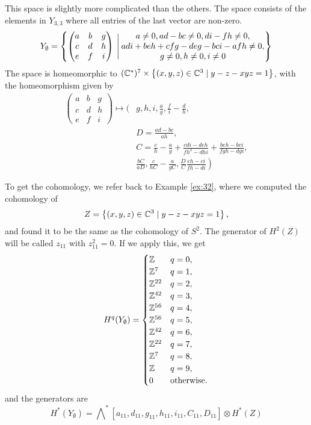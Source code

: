 This space is slightly more complicated than the others. The space
consists of the elements in $Y_{3,3}$ where all entries of the last
vector are non-zero.
\[ Y_{\emptyset} = \left\{ 
  \begin{pmatrix}
    a & b & g \\
    c & d & h \\
    e & f & i
  \end{pmatrix} \:\Bigg\vert\:
  \begin{matrix}
    a \neq 0, ad-bc \neq 0, di-fh \neq 0, \\
    adi+beh+cfg-deg-bci-afh \neq 0, \\
    g\neq 0, h\neq 0, i\neq 0
  \end{matrix}  \right\}\]
The space is homeomorphic to $(\mathbb{C}^*)^7\times \left\{  (x,y,z)\in \mathbb{C}^3
  \mid y-z-xyz = 1 \right\}$, with the homeomorphism given by
\begin{align*}
  \begin{pmatrix}
    a & b & g \\
    c & d & h \\
    e & f & i
  \end{pmatrix} \mapsto \bigg(&g, h, i, \frac{a}{g},
    \frac{f}{i}-\frac{d}{h},\\
  &D=\frac{ad-bc}{ah}, \\
  &C=\frac{c}{h}-\frac{a}{g}+\frac{cdi-deh}{fh^2-dhi} +
  \frac{beh-bci}{fgh-dgi},\\
  &\left.\frac{bC}{aD},\frac{c}{hC}-\frac{a}{gC},
    \frac{D}{C}\frac{eh-ci}{fh-di}\right)
\end{align*}

To get the cohomology, we refer back to Example \ref{ex:32}, where we
computed the cohomology of
\[ Z=\left\{ (x,y,z)\in\mathbb{C}^3 \mid y-z-xyz = 1 \right\}, \]
and found it to be the same as the cohomology of $S^2$. The generator of
$H^2(Z)$ will be called $z_{11}$ with $z_{11}^2 = 0$. If we apply
this, we get
\[ H^q(Y_{\emptyset}) =
\begin{cases}
  \mathbb{Z} & q = 0, \\
  \mathbb{Z}^7 & q = 1, \\
    \mathbb{Z}^{22} & q = 2, \\
    \mathbb{Z}^{42} & q = 3, \\
    \mathbb{Z}^{56} & q = 4, \\
    \mathbb{Z}^{56} & q = 5, \\
    \mathbb{Z}^{42} & q = 6, \\
    \mathbb{Z}^{22} & q = 7, \\
    \mathbb{Z}^{7} & q = 8, \\
    \mathbb{Z} & q = 9, \\
    0 & \text{otherwise}.
  \end{cases} \] 
and the generators are
\[ H^*(Y_{\emptyset}) =
\bigwedge\nolimits^*[a_{11},d_{11},g_{11},h_{11},i_{11},C_{11},D_{11}]
\otimes H^*(Z) \]


